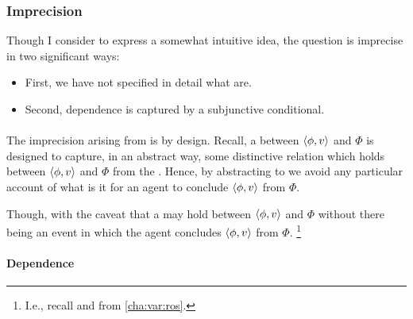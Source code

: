 \subsubsection{Imprecision}

\begin{note}
  Though I consider \qWhyV{} to express a somewhat intuitive idea, the question is imprecise in two significant ways:
  \begin{itemize}[noitemsep]
  \item
    First, we have not specified in detail what \ros{} are.
  \item
    Second, dependence is captured by a subjunctive conditional.
  \end{itemize}
\end{note}

\paragraph{}

\begin{note}
  The imprecision arising from  is by design.
  Recall, a \ros{} between \(\langle \phi, v \rangle\) and \(\Phi\) is designed to capture, in an abstract way, some distinctive relation which holds between \(\langle \phi, v \rangle\) and \(\Phi\) from the \agpe{}.
  Hence, by abstracting to  we avoid any particular account of what is it for an agent to conclude \(\langle \phi, v \rangle\) from \(\Phi\).

  Though, with the caveat that a \ros{} may hold between \(\langle \phi, v \rangle\) and \(\Phi\) without there being an event in which the agent concludes \(\langle \phi, v \rangle\) from \(\Phi\).%
  \footnote{
    I.e., recall \supportI{} and \supportII{} from \autoref{cha:var:ros}.
  }
\end{note}

\paragraph{Dependence}

\nocite{Lewis:1973aa}

